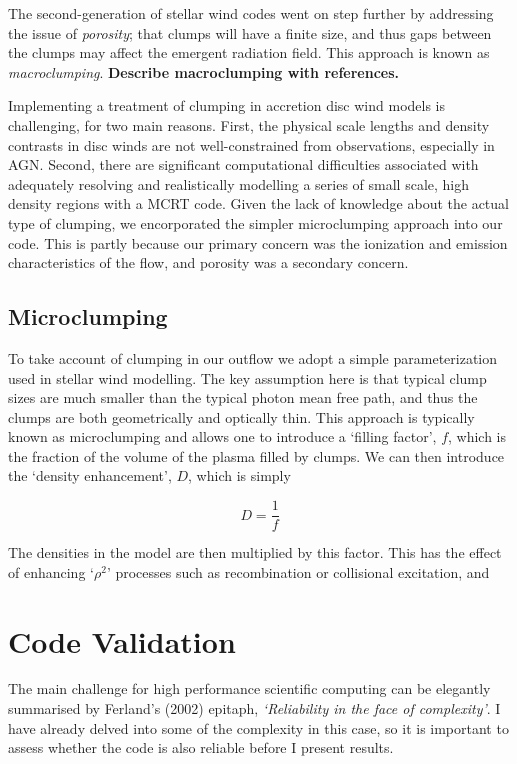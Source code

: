 The second-generation of stellar wind codes went on step further by addressing the issue
of {\em porosity}; that clumps will have a finite size, and thus gaps between the clumps
may affect the emergent radiation field. This approach is known as {\em macroclumping}.
{\bf Describe macroclumping with references.}

Implementing a treatment of clumping in accretion disc wind models is challenging, for
two main reasons. First, the physical scale lengths and density contrasts 
in disc winds are not well-constrained from observations, especially in AGN.  
Second, there are significant computational difficulties associated with adequately
resolving and realistically modelling a series of small scale, high density
regions with a MCRT code. Given the lack of knowledge about the actual 
type of clumping, we encorporated the simpler microclumping approach into our code.
This is partly because our primary concern was the ionization and 
emission characteristics of the flow, and porosity was a secondary concern.


\subsection{Microclumping}

To take account of clumping in our outflow we adopt a simple parameterization
used in stellar wind modelling. The key assumption here is that typical clump sizes
are much smaller than the typical photon mean free path, and thus the clumps are 
both geometrically and optically thin. This approach is typically 
known as microclumping and allows one to introduce a `filling factor', $f$, which is the 
fraction of the volume of the plasma filled by clumps. We can then introduce the 
`density enhancement', $D$, which is simply 

\begin{equation}
D = \frac{1}{f}
\end{equation}

The densities in the model are then multiplied by this factor. This has the effect 
of enhancing `$\rho^2$' processes such as recombination or collisional excitation,
and 


\section{Code Validation}
\label{sec:code_validation}

The main challenge for high performance scientific computing can be 
elegantly summarised by Ferland's (2002) epitaph, {\sl `Reliability in the face 
of complexity'}. I have already delved into some of the complexity in this case,
so it is important to assess whether the code is also reliable before I present
results. 

